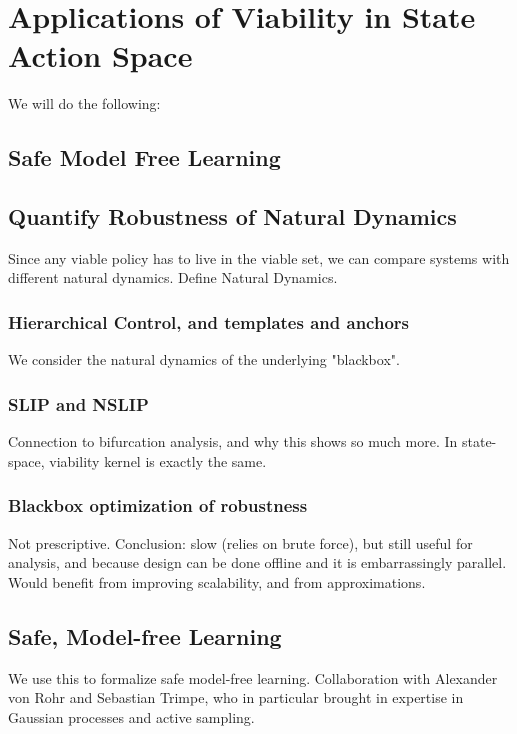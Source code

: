 
\chapter{Applications of Viability in State Action Space}

We will do the following:

\section{Safe Model Free Learning}

\section{Quantify Robustness of Natural Dynamics}
Since any viable policy has to live in the viable set, we can compare systems with different natural dynamics. Define Natural Dynamics.
\subsection{Hierarchical Control, and templates and anchors}
We consider the natural dynamics of the underlying "blackbox".
\subsection{SLIP and NSLIP}
Connection to bifurcation analysis, and why this shows so much more. In state-space, viability kernel is exactly the same.
\subsection{Blackbox optimization of robustness}
Not prescriptive. Conclusion: slow (relies on brute force), but still useful for analysis, and because design can be done offline and it is embarrassingly parallel. Would benefit from improving scalability, and from approximations.

\section{Safe, Model-free Learning}
We use this to formalize safe model-free learning. Collaboration with Alexander von Rohr and Sebastian Trimpe, who in particular brought in expertise in Gaussian processes and active sampling.
